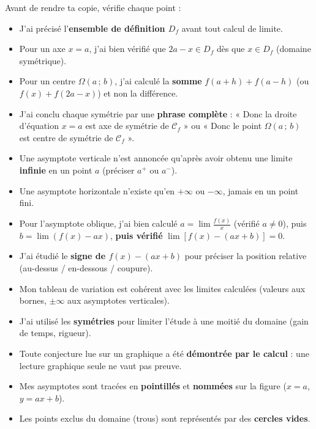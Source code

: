 \documentclass[11pt]{article}
\begin{document}
\begin{aretenir}
Avant de rendre ta copie, vérifie chaque point :
\begin{itemize}
\item[$\square$] J'ai précisé l'\textbf{ensemble de définition $D_f$} avant tout calcul de limite.
\item[$\square$] Pour un axe $x=a$, j'ai bien vérifié que $2a-x\in D_f$ dès que $x\in D_f$ (domaine symétrique).
\item[$\square$] Pour un centre $\Omega(a\,;\,b)$, j'ai calculé la \textbf{somme} $f(a+h)+f(a-h)$ (ou $f(x)+f(2a-x)$) et non la différence.
\item[$\square$] J'ai conclu chaque symétrie par une \textbf{phrase complète} : « Donc la droite d'équation $x=a$ est axe de symétrie de $\mathcal{C}_f$ » ou « Donc le point $\Omega(a\,;\,b)$ est centre de symétrie de $\mathcal{C}_f$ ».
\item[$\square$] Une asymptote verticale n'est annoncée qu'après avoir obtenu une limite \textbf{infinie} en un point $a$ (préciser $a^+$ ou $a^-$).
\item[$\square$] Une asymptote horizontale n'existe qu'en $+\infty$ ou $-\infty$, jamais en un point fini.
\item[$\square$] Pour l'asymptote oblique, j'ai bien calculé $a=\lim\frac{f(x)}{x}$ (vérifié $a\neq 0$), puis $b=\lim(f(x)-ax)$, \textbf{puis vérifié} $\lim[f(x)-(ax+b)]=0$.
\item[$\square$] J'ai étudié le \textbf{signe de $f(x)-(ax+b)$} pour préciser la position relative (au-dessus / en-dessous / coupure).
\item[$\square$] Mon tableau de variation est cohérent avec les limites calculées (valeurs aux bornes, $\pm\infty$ aux asymptotes verticales).
\item[$\square$] J'ai utilisé les \textbf{symétries} pour limiter l'étude à une moitié du domaine (gain de temps, rigueur).
\item[$\square$] Toute conjecture lue sur un graphique a été \textbf{démontrée par le calcul} : une lecture graphique seule ne vaut pas preuve.
\item[$\square$] Mes asymptotes sont tracées en \textbf{pointillés} et \textbf{nommées} sur la figure ($x=a$, $y=ax+b$).
\item[$\square$] Les points exclus du domaine (trous) sont représentés par des \textbf{cercles vides}.
\end{itemize}
\end{aretenir}
\end{document}
